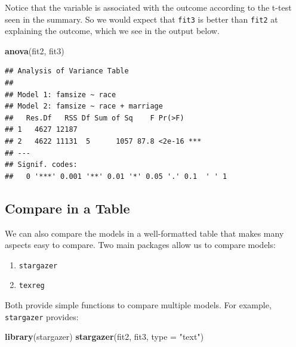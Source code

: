\documentclass[]{tufte-book}
\newenvironment{Shaded}{}{}
\newcommand{\KeywordTok}[1]{\textcolor[rgb]{0.00,0.44,0.13}{\textbf{#1}}}
\newcommand{\DataTypeTok}[1]{\textcolor[rgb]{0.56,0.13,0.00}{#1}}
\newcommand{\StringTok}[1]{\textcolor[rgb]{0.25,0.44,0.63}{#1}}
\newcommand{\NormalTok}[1]{#1}
\providecommand{\tightlist}{%
  \setlength{\itemsep}{0pt}\setlength{\parskip}{0pt}}
\theoremstyle{definition}
\theoremstyle{definition}
\theoremstyle{remark}
\begin{document}
Notice that the variable is associated with the outcome according to the
t-test seen in the summary. So we would expect that \texttt{fit3} is
better than \texttt{fit2} at explaining the outcome, which we see in the
output below.

\begin{Shaded}
\begin{Highlighting}[]
\KeywordTok{anova}\NormalTok{(fit2, fit3)}
\end{Highlighting}
\end{Shaded}

\begin{verbatim}
## Analysis of Variance Table
## 
## Model 1: famsize ~ race
## Model 2: famsize ~ race + marriage
##   Res.Df   RSS Df Sum of Sq    F Pr(>F)    
## 1   4627 12187                             
## 2   4622 11131  5      1057 87.8 <2e-16 ***
## ---
## Signif. codes:  
##   0 '***' 0.001 '**' 0.01 '*' 0.05 '.' 0.1  ' ' 1
\end{verbatim}

\subsection*{Compare in a Table}\label{compare-in-a-table}

We can also compare the models in a well-formatted table that makes many
aspects easy to compare. Two main packages allow us to compare models:

\begin{enumerate}
\def\labelenumi{\arabic{enumi}.}
\tightlist
\item
  \texttt{stargazer}
\item
  \texttt{texreg}
\end{enumerate}

Both provide simple functions to compare multiple models. For example,
\texttt{stargazer} provides:

\begin{Shaded}
\begin{Highlighting}[]
\KeywordTok{library}\NormalTok{(stargazer)}
\KeywordTok{stargazer}\NormalTok{(fit2, fit3, }\DataTypeTok{type =} \StringTok{"text"}\NormalTok{)}
\end{Highlighting}
\end{Shaded}
\end{document}
